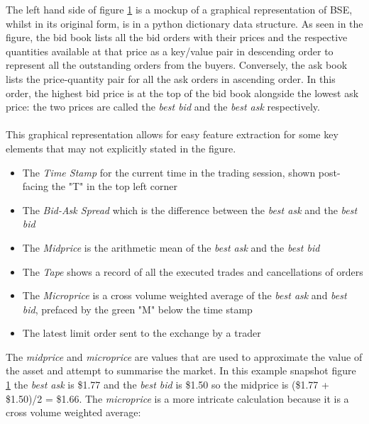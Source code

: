\documentclass[ %
                    author={Ashwinder Khurana},
                supervisor={Prof Dave Cliff},
                    degree={MEng},
                     title={The Deeply Reinforced Trader},
                  subtitle={},
                      type={enterprise},
                      year={2020} ]{dissertation}
\begin{document}
\begin{figure}[H]
\label{fig:lob}  
\end{figure}
\noindent
The left hand side of figure \ref{fig:lob} is a mockup of a graphical representation of BSE, whilst in its original form, is in a python dictionary data structure.
As seen in the figure, the bid book lists all the bid orders with their prices and the respective quantities available at that price as a key/value pair in descending order to represent all the outstanding orders from the buyers. Conversely, the ask book lists the price-quantity pair for all the ask orders in ascending order. In this order, the highest bid price is at the top of the bid book alongside the lowest ask price: the two prices are called the \textit{best bid} and the \textit{best ask} respectively. 
\\
\\
This graphical representation allows for easy feature extraction for some key elements that may not explicitly stated in the figure. 
\begin{itemize}
\item The \textit{Time Stamp} for the current time in the trading session, shown post-facing the "T" in the top left corner
\item The \textit{Bid-Ask Spread} which is the difference between the \textit{best ask} and the \textit{best bid}
\item The \textit{Midprice} is the arithmetic mean of the \textit{best ask} and the \textit{best bid}
\item The \textit{Tape} shows a record of all the executed trades and cancellations of orders
\item The \textit{Microprice} is a cross volume weighted average of the \textit{best ask} and \textit{best bid}, prefaced by the green "M" below the time stamp
\item The latest limit order sent to the exchange by a trader

\end{itemize}
\noindent
The \textit{midprice} and \textit{microprice} are values that are used to approximate the value of the asset and attempt to summarise the market. In this example snapshot figure \ref{fig:lob} the \textit{best ask} is \$1.77 and the \textit{best bid} is \$1.50 so the midprice is (\$1.77 +  \$1.50)/2 = \$1.66. The \textit{microprice} is a more intricate calculation because it is a cross volume weighted average:
\end{document}
